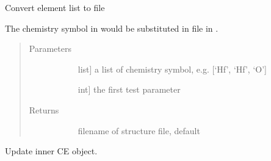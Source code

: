 \documentclass[letterpaper,10pt,english]{sphinxmanual}
\begin{document}
\begin{fulllineitems}
\begin{fulllineitems}
\begin{quote}
\begin{description}
\end{description}\end{quote}

\end{fulllineitems}


\begin{fulllineitems}
\label{\detokenize{pygace:pygace.gace.AbstractApp.transver_to_struct}}
Convert element list to   file

The chemistry symbol in  would be substituted in
 file in .
\begin{quote}\begin{description}
\item[{Parameters}] \leavevmode\begin{description}
\item[{}] \leavevmode{[}list{]}
a list of chemistry symbol, e.g. {[}‘Hf’, ‘Hf’, ‘O’{]}

\item[{}] \leavevmode{[}int{]}
the first test parameter

\end{description}

\item[{Returns}] \leavevmode\begin{description}
\item[{}] \leavevmode
filename of  structure file, default 

\end{description}

\end{description}\end{quote}

\end{fulllineitems}


\begin{fulllineitems}
\label{\detokenize{pygace:pygace.gace.AbstractApp.update_ce}}
Update inner CE object.


\end{fulllineitems}
\end{fulllineitems}
\end{document}
